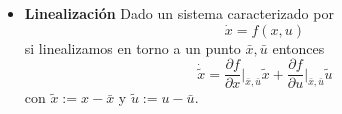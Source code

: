 \documentclass[
  11pt,
  letterpaper,
   addpoints,
   answers
  ]{exam}
\begin{document}
\begin{itemize}
    \item \textbf{Linealización} Dado un sistema caracterizado por
    \[
    \dot{x} = f(x, u) \tag{5}
    \]
    si linealizamos en torno a un punto $\bar{x}, \bar{u}$ entonces
    \[
    \dot{\tilde{x}} = \frac{\partial f}{\partial x}\Big|_{\bar{x}, \bar{u}} \tilde{x} + \frac{\partial f}{\partial u}\Big|_{\bar{x}, \bar{u}} \tilde{u} \tag{6}
    \]
    con $\tilde{x} := x - \bar{x}$ y $\tilde{u} := u - \bar{u}$.
\end{itemize}
\end{document}
